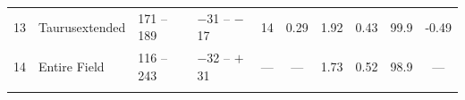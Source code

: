\documentclass[useAMS,usenatbib]{mn2e}
\begin{document}
\begin{table}
\begin{center}
\begin{tabular}{llllcccccc}
13 & Taurusextended    & 171 -- 189 & $-$31 -- $-$17 & 14 & 0.29 & 1.92 & 0.43 & 99.9 & -0.49 \\
14 & Entire Field      & 116 -- 243 & $-$32 -- $+$31 & ---& ---  & 1.73 & 0.52 & 98.9 & ---   \\                \\
\end{tabular}
\end{center}
\end{table}
\end{document}
